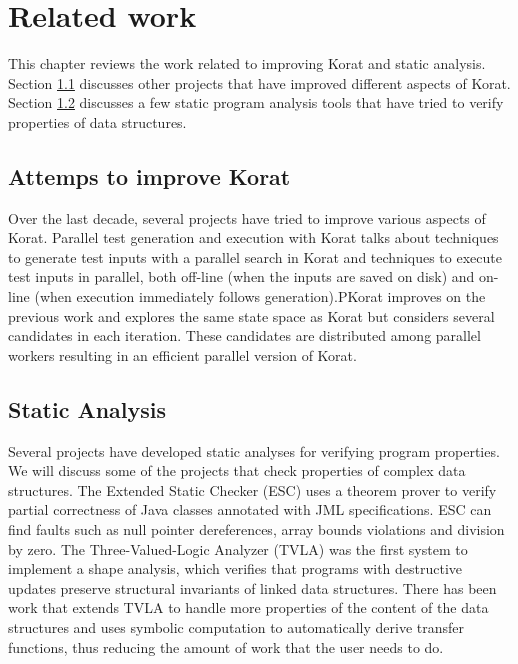 \chapter{Related work}
\label{ch:related-work}
This chapter reviews the work related to improving Korat and static analysis. Section \ref{sec:attempts-to-improve-korat} discusses other projects that have improved different aspects of Korat. Section \ref{sec:related-static-analyses} discusses a few static program analysis tools that have tried to verify properties of data structures.

\section{Attemps to improve Korat}
\label{sec:attempts-to-improve-korat}
Over the last decade, several projects have tried to improve various
aspects of Korat. Parallel test generation and execution with Korat
\cite{misailovic2007parallel} talks about techniques to generate test inputs with a
parallel search in Korat and techniques to execute test inputs in
parallel, both off-line (when the inputs are saved on disk) and
on-line (when execution immediately follows generation).PKorat
\cite{siddiqui2009pkorat} improves on the previous work and explores the same state
space as Korat but considers several candidates in each
iteration. These candidates are distributed among parallel workers
resulting in an efficient parallel version of Korat.



\section{Static Analysis}
\label{sec:related-static-analyses}
Several projects have developed static analyses for verifying program
properties. We will discuss some of the projects that check properties
of complex data structures. The Extended Static Checker (ESC)
\cite{flanagan2002extended} uses a theorem prover to verify partial correctness of Java
classes annotated with JML specifications. ESC can find faults such as
null pointer dereferences, array bounds violations and division by
zero. The Three-Valued-Logic Analyzer (TVLA) \cite{sagiv2002parametric} was the first
system to implement a shape analysis, which verifies that programs
with destructive updates preserve structural invariants of linked data
structures. There has been work \cite{yorsh2004symbolically}  that extends TVLA to
handle more properties of the content of the data structures and uses
symbolic computation to automatically derive transfer functions, thus
reducing the amount of work that the user needs to do.

